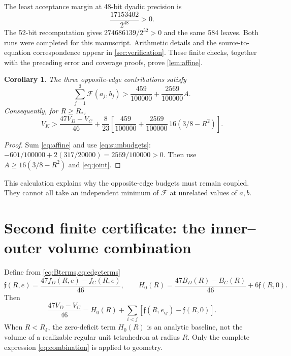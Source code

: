 \documentclass[11pt]{article}
\numberwithin{equation}{section}
\newtheorem{corollary}[theorem]{Corollary}
\theoremstyle{definition}\newtheorem{definition}[theorem]{Definition}
\theoremstyle{remark}\newtheorem{remark}[theorem]{Remark}
\newcommand{\RJ}{R_{\mathrm J}}
\newcommand{\RS}{R_*}
\begin{document}
The least acceptance margin at 48-bit dyadic precision is
\begin{equation}\label{eq:margin48}
 \frac{17153402}{2^{48}}>0.
\end{equation}
The 52-bit recomputation gives $274686139/2^{52}>0$ and the same 584 leaves.
Both runs were completed for this manuscript. Arithmetic details and the
source-to-equation correspondence appear in \cref{sec:verification}.
These finite checks, together with the preceding error and coverage proofs,
prove \cref{lem:affine}.

\begin{corollary}\label{cor:sumaffine}
The three opposite-edge contributions satisfy
\begin{equation}\label{eq:sumaffine}
 \sum_{j=1}^3\mathcal F(a_j,b_j)>
       \frac{459}{100000}+\frac{2569}{100000}A.
\end{equation}
Consequently, for $R\ge\RS$,
\begin{equation}\label{eq:nearstructure}
 \boxed{V_K>\frac{47V_D-V_C}{46}
 +\frac8{23}\left[\frac{459}{100000}
           +\frac{2569}{100000}\,16(3/8-R^2)\right].}
\end{equation}
\end{corollary}
\begin{proof}
Sum \cref{eq:affine} and use \cref{eq:sumbudgets}:
$-601/100000+2(317/20000)=2569/100000>0$.
Then use $A\ge16(3/8-R^2)$ and \cref{eq:joint}.
\end{proof}
This calculation explains why the opposite-edge budgets must remain coupled.
They cannot all take an independent minimum of $\mathcal F$ at unrelated
values of $a,b$.

\section{Second finite certificate: the inner--outer volume combination}\label{sec:hullcert}
Define from \cref{eq:Bterms,eq:edgeterms}
\begin{equation}\label{eq:frakf}
 \mathfrak f(R,e)=\frac{47f_D(R,e)-f_C(R,e)}{46},\qquad
 H_0(R)=\frac{47B_D(R)-B_C(R)}{46}+6\mathfrak f(R,0).
\end{equation}
Then
\begin{equation}\label{eq:combination}
 \frac{47V_D-V_C}{46}
 =H_0(R)+\sum_{i<j}[\mathfrak f(R,e_{ij})-\mathfrak f(R,0)].
\end{equation}
When $R<\RJ$, the zero-deficit term $H_0(R)$ is an analytic baseline, not
the volume of a realizable regular unit tetrahedron at radius $R$.
Only the complete expression \cref{eq:combination} is applied to geometry.
\end{document}
